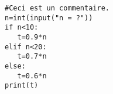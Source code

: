 \documentclass[11pt,a4paper]{book}
\begin{document}
\begin{minipage}{8cm} %

\begin{lstlisting}[style=stylepython]
#Ceci est un commentaire.
n=int(input("n = ?"))
if n<10:
   t=0.9*n
elif n<20:
   t=0.7*n
else:
   t=0.6*n
print(t)

\end{lstlisting}

\end{minipage} %
\end{document}
